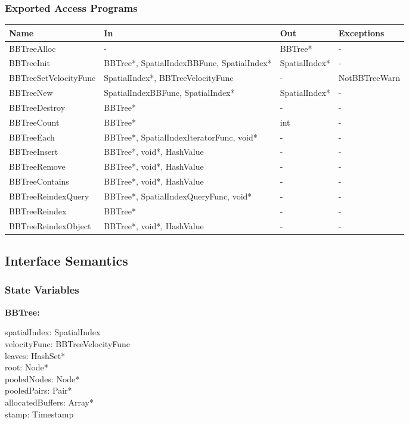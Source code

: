 \documentclass[12pt]{article}
\begin{document}
\subsubsection{Exported Access Programs} \label{SecEAPLinked}
	\renewcommand*{\arraystretch}{1.2}
	\begin{longtable}{| y | x{3.7cm} | y | x{3.7cm} |}
	\hline \textbf{Name} & \textbf{In} & \textbf{Out} & \textbf{Exceptions} \\ \hline 
	BBTreeAlloc & - & BBTree* & - \\ \hline
	BBTreeInit & BBTree*, SpatialIndexBBFunc, SpatialIndex* & SpatialIndex* & - \\ \hline
	BBTreeSetVelocityFunc & SpatialIndex*, BBTreeVelocityFunc & - & NotBBTreeWarn \\ \hline
	BBTreeNew & SpatialIndexBBFunc, SpatialIndex* & SpatialIndex* & - \\ \hline
	BBTreeDestroy & BBTree* & - & - \\ \hline
	BBTreeCount & BBTree* & int & - \\ \hline
	BBTreeEach & BBTree*, SpatialIndexIteratorFunc, void* & - & - \\ \hline
	BBTreeInsert & BBTree*, void*, HashValue & - & - \\ \hline
	BBTreeRemove & BBTree*, void*, HashValue & - & - \\ \hline
	BBTreeContains & BBTree*, void*, HashValue & - & - \\ \hline
	BBTreeReindexQuery & BBTree*, SpatialIndexQueryFunc, void* & - & - \\ \hline
	BBTreeReindex & BBTree* & - & - \\ \hline
	BBTreeReindexObject & BBTree*, void*, HashValue & - & - \\ \hline
\end{longtable}

\subsection{Interface Semantics}

\subsubsection{State Variables} \label{SecSVLinked}
\textbf{BBTree:} 
\begin{multicols}{3}
	\noindent spatialIndex: SpatialIndex \\
	velocityFunc: BBTreeVelocityFunc \\
	leaves: HashSet* \\
	root: Node* \\
	pooledNodes: Node* \\
	pooledPairs: Pair* \\
	allocatedBuffers: Array* \\
	stamp: Timestamp
\end{multicols}
\end{document}
